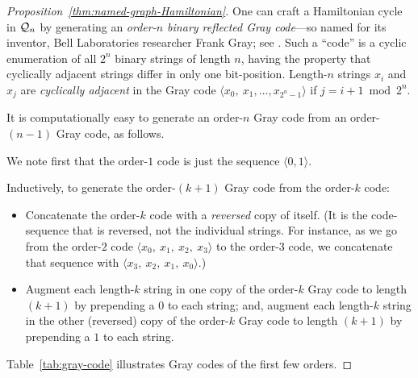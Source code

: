 \begin{proof}[Proposition~\ref{thm:named-graph-Hamiltonian}]
\smallskip

  

One can craft a Hamiltonian cycle in $\mbox{$\cal Q$}_n$ by generating an {\it order-$n$ binary reflected Gray code}---so named for its inventor, Bell Laboratories researcher Frank Gray; see \cite{PetersonW81}.   Such a ``code'' is a cyclic enumeration of all $2^n$ binary strings of length $n$, having the property that cyclically adjacent strings differ in only one bit-position.  Length-$n$ 
strings $x_i$ and $x_j$ are {\it cyclically adjacent} in the Gray code $\langle x_0, \ x_1, \ldots, x_{2^n-1} \rangle$ if $j = i+1 \bmod 2^n$.

\smallskip

\noindent
It is computationally easy to generate an order-$n$ Gray code from an order-$(n-1)$ Gray code, as follows.

\smallskip

We note first that the order-$1$ code is just the sequence $\langle 0, 1 \rangle$.

\smallskip

Inductively, to generate the order-$(k+1)$ Gray code from the order-$k$ code:
\begin{itemize}
\item
Concatenate the order-$k$ code with a {\em reversed} copy of itself.  (It is the code-sequence that is reversed, not the individual strings.  For instance, as we go from the order-$2$ code $\langle x_0, \ x_1, \ x_2, \ x_3 \rangle$ to the order-$3$ code, we concatenate that sequence with $\langle x_3, \ x_2, \ x_1, \ x_0 \rangle$.)

\medskip\item
Augment each length-$k$ string in one copy of the order-$k$ Gray code to length $(k+1)$ by prepending a $0$ to each string; and, augment each length-$k$ string in the other (reversed) copy of the order-$k$ Gray code to length $(k+1)$ by prepending a $1$ to each string.
\end{itemize}
Table~\ref{tab:gray-code} illustrates Gray codes of the first few orders.


\end{proof}
